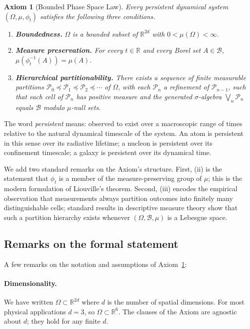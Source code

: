 \documentclass[11pt,twocolumn,a4paper]{article}
\theoremstyle{axiomstyle}
\newtheorem{axiom}{Axiom}
\theoremstyle{conseqstyle}
\theoremstyle{definition}
\theoremstyle{remark}
\newcommand{\Partition}{\mathcal{P}}
\newcommand{\Real}{\mathbb{R}}
\begin{document}
\begin{axiom}[Bounded Phase Space Law]
\label{ax:bpsl}
Every \emph{persistent} dynamical system $(\Omega,\mu,\phi_{t})$ satisfies the following three conditions.
\begin{enumerate}[label=(\roman*)]
  \item \textbf{Boundedness.} $\Omega$ is a bounded subset of $\Real^{2d}$ with $0<\mu(\Omega)<\infty$.
  \item \textbf{Measure preservation.} For every $t\in\Real$ and every Borel set $A\in\mathcal{B}$, $\mu(\phi_{t}^{-1}(A))=\mu(A)$.
  \item \textbf{Hierarchical partitionability.} There exists a sequence of finite measurable partitions $\Partition_{0}\preceq\Partition_{1}\preceq\Partition_{2}\preceq\cdots$ of $\Omega$, with each $\Partition_{n}$ a refinement of $\Partition_{n-1}$, such that each cell of $\Partition_{n}$ has positive measure and the generated $\sigma$-algebra $\bigvee_{n}\Partition_{n}$ equals $\mathcal{B}$ modulo $\mu$-null sets.
\end{enumerate}
\end{axiom}

The word \emph{persistent} means: observed to exist over a macroscopic range of times relative to the natural dynamical timescale of the system. An atom is persistent in this sense over its radiative lifetime; a nucleon is persistent over its confinement timescale; a galaxy is persistent over its dynamical time.

We add two standard remarks on the Axiom's structure. First, (ii) is the statement that $\phi_{t}$ is a member of the measure-preserving group of $\mu$; this is the modern formulation of Liouville's theorem. Second, (iii) encodes the empirical observation that measurements always partition outcomes into finitely many distinguishable cells; standard results in descriptive measure theory \citep{halmos1950,rudin1987} show that such a partition hierarchy exists whenever $(\Omega,\mathcal{B},\mu)$ is a Lebesgue space.

\subsection{Remarks on the formal statement}

A few remarks on the notation and assumptions of Axiom~\ref{ax:bpsl}:

\paragraph{Dimensionality.} We have written $\Omega\subset\Real^{2d}$ where $d$ is the number of spatial dimensions. For most physical applications $d=3$, so $\Omega\subset\Real^{6}$. The clauses of the Axiom are agnostic about $d$; they hold for any finite $d$.
\end{document}
